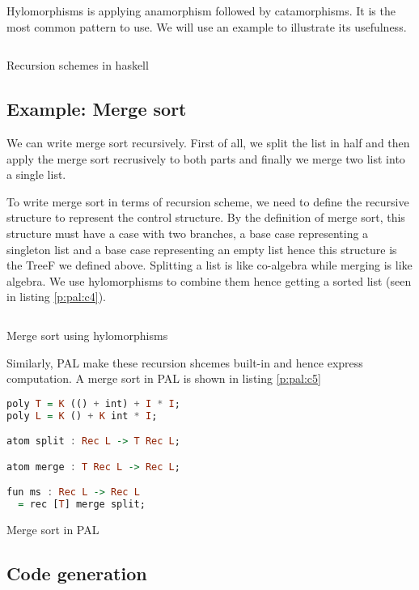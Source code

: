 Hylomorphisms is applying anamorphism followed by catamorphisms. It is the most common pattern to use. We will use an example to illustrate its usefulness. 
\begin{listing}[ht]
\inputminted{haskell}{project/pal-rs.hs}
\caption{Recursion schemes in haskell} \label{p:pal:c3}
\end{listing}
\subsection{Example: Merge sort}
We can write merge sort recursively. First of all, we split the list in half and then apply the merge sort recrusively to both parts and finally we merge two list into a single list. 

To write merge sort in terms of recursion scheme, we need to define the recursive structure to represent the control structure. By the definition of merge sort, this structure must have a case with two branches, a base case representing a singleton list and a base case representing an empty list hence this structure is the TreeF we defined above. Splitting a list is like co-algebra while merging is like algebra. We use hylomorphisms to combine them hence getting a sorted list (seen in listing \ref{p:pal:c4}).
\begin{listing}[ht]
\inputminted{haskell}{project/pal-ms.hs}
\caption{Merge sort using hylomorphisms} \label{p:pal:c4}
\end{listing}

Similarly, PAL make these recursion shcemes built-in and hence express computation. A merge sort in PAL is shown in listing \ref{p:pal:c5}
\begin{listing}[ht]
\begin{lstlisting}[language=haskell]
poly T = K (() + int) + I * I;
poly L = K () + K int * I;

atom split : Rec L -> T Rec L;

atom merge : T Rec L -> Rec L;

fun ms : Rec L -> Rec L
  = rec [T] merge split;
\end{lstlisting}
\caption{Merge sort in PAL} \label{p:pal:c5}
\end{listing}

\subsection{Code generation}
